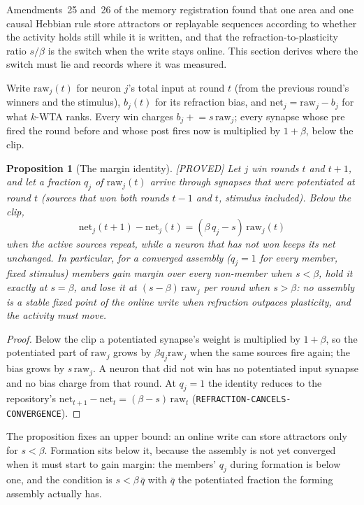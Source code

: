 \documentclass[11pt]{article}
\theoremstyle{definition}
\theoremstyle{plain}
\newtheorem{proposition}[lemma]{Proposition}
\newcommand{\PROVED}{\textnormal{\footnotesize\textsf{[PROVED]}}}
\begin{document}
Amendments~25 and~26 of the memory registration found that one area and one
causal Hebbian rule store attractors or replayable sequences according to
whether the activity holds still while it is written, and that the
refraction-to-plasticity ratio $s/\beta$ is the switch when the write stays
online. This section derives where the switch must lie and records where it
was measured.

Write $\mathrm{raw}_j(t)$ for neuron $j$'s total input at round $t$ (from the
previous round's winners and the stimulus), $b_j(t)$ for its refraction bias,
and $\mathrm{net}_j = \mathrm{raw}_j - b_j$ for what $k$-WTA ranks. Every win
charges $b_j \mathrel{+}= s\,\mathrm{raw}_j$; every synapse whose pre fired the
round before and whose post fires now is multiplied by $1 + \beta$, below the
clip.

\begin{proposition}[The margin identity]\label{prop:margin} \PROVED
Let $j$ win rounds $t$ and $t+1$, and let a fraction $q_j$ of
$\mathrm{raw}_j(t)$ arrive through synapses that were potentiated at round $t$
(sources that won both rounds $t-1$ and $t$, stimulus included). Below the
clip,
\[
\mathrm{net}_j(t+1) - \mathrm{net}_j(t) = (\beta\, q_j - s)\,\mathrm{raw}_j(t)
\]
when the active sources repeat, while a neuron that has not won keeps its
net unchanged. In particular, for a converged assembly ($q_j = 1$ for every
member, fixed stimulus) members gain margin over every non-member when
$s < \beta$, hold it exactly at $s = \beta$, and lose it at $(s - \beta)\,
\mathrm{raw}_j$ per round when $s > \beta$: \emph{no assembly is a stable
fixed point of the online write when refraction outpaces plasticity}, and the
activity must move.
\end{proposition}

\begin{proof}
Below the clip a potentiated synapse's weight is multiplied by $1+\beta$, so
the potentiated part of $\mathrm{raw}_j$ grows by $\beta q_j \mathrm{raw}_j$
when the same sources fire again; the bias grows by $s\,\mathrm{raw}_j$. A
neuron that did not win has no potentiated input synapse and no bias charge
from that round. At $q_j = 1$ the identity reduces to the repository's
$\mathrm{net}_{t+1} - \mathrm{net}_t = (\beta - s)\,\mathrm{raw}_t$
(\texttt{REFRACTION-CANCELS-CONVERGENCE}).
\end{proof}

The proposition fixes an upper bound: an online write can store attractors
only for $s < \beta$. Formation sits below it, because the assembly is not
yet converged when it must start to gain margin: the members' $q_j$ during
formation is below one, and the condition is $s < \beta\, \bar q$ with
$\bar q$ the potentiated fraction the forming assembly actually has.
\end{document}
